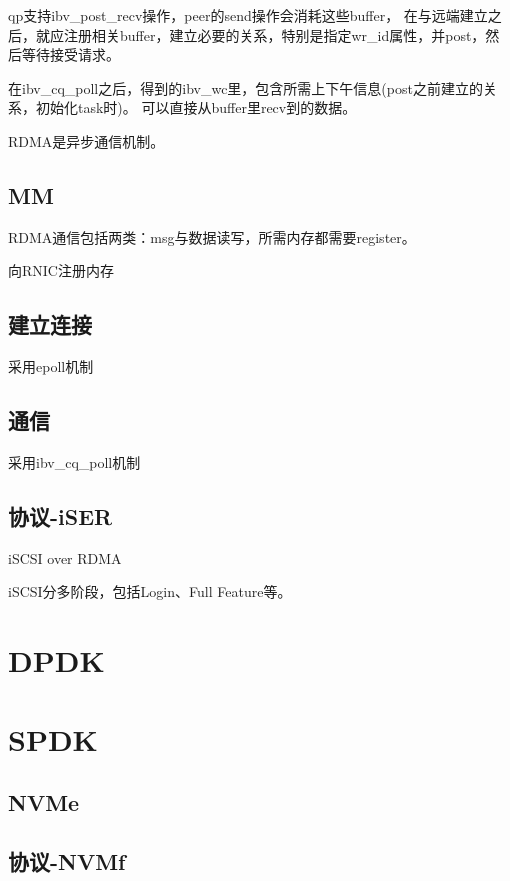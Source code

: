 qp支持ibv\_post\_recv操作，peer的send操作会消耗这些buffer，
在与远端建立之后，就应注册相关buffer，建立必要的关系，特别是指定wr\_id属性，并post，然后等待接受请求。

在ibv\_cq\_poll之后，得到的ibv\_wc里，包含所需上下午信息(post之前建立的关系，初始化task时)。
可以直接从buffer里recv到的数据。

RDMA是异步通信机制。

\subsection{MM}

RDMA通信包括两类：msg与数据读写，所需内存都需要register。

向RNIC注册内存

\subsection{建立连接}

采用epoll机制

\subsection{通信}

采用ibv\_cq\_poll机制

\subsection{协议-iSER}

iSCSI over RDMA

iSCSI分多阶段，包括Login、Full Feature等。

\section{DPDK}

\section{SPDK}

\subsection{NVMe}

\subsection{协议-NVMf}

